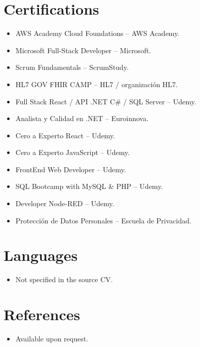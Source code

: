 \documentclass[11pt,a4paper,sans]{moderncv}
\begin{document}

\section{Certifications}
\vspace{1pt}
\begin{itemize}
\item AWS Academy Cloud Foundations -- AWS Academy.
\item Microsoft Full-Stack Developer -- Microsoft.
\item Scrum Fundamentals -- ScrumStudy.
\item HL7 GOV FHIR CAMP -- HL7 / organización HL7.
\item Full Stack React / API .NET C\# / SQL Server -- Udemy.
\item Analista y Calidad en .NET -- Euroinnova.
\item Cero a Experto React -- Udemy.
\item Cero a Experto JavaScript -- Udemy.
\item FrontEnd Web Developer -- Udemy.
\item SQL Bootcamp with MySQL \& PHP -- Udemy.
\item Developer Node-RED -- Udemy.
\item Protección de Datos Personales -- Escuela de Privacidad.
\end{itemize}


\section{Languages}
\vspace{1pt}
\begin{itemize}
\item Not specified in the source CV.
\end{itemize}


\section{References}
\vspace{1pt}
\begin{itemize}
\item{Available upon request.}
\end{itemize}
\end{document}
